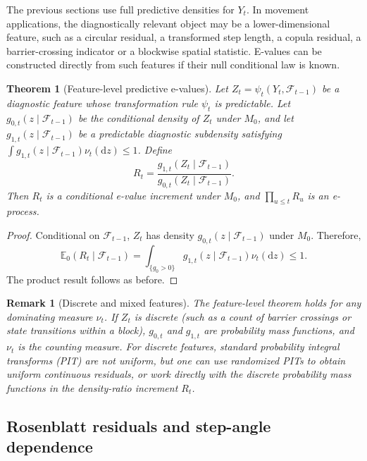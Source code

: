 \documentclass[pdflatex,sn-basic]{sn-jnl}
\theoremstyle{thmstyleone}
\newtheorem{theorem}{Theorem}
\theoremstyle{thmstyletwo}
\newtheorem{remark}{Remark}
\theoremstyle{thmstylethree}
\newcommand{\E}{\mathbb E}
\newcommand{\1}{\mathbf 1}
\newcommand{\calF}{\mathcal F}
\begin{document}
The previous sections use full predictive densities for $Y_t$. In movement applications, the diagnostically relevant object may be a lower-dimensional feature, such as a circular residual, a transformed step length, a copula residual, a barrier-crossing indicator or a blockwise spatial statistic. E-values can be constructed directly from such features if their null conditional law is known.

\begin{theorem}[Feature-level predictive e-values]
\label{thm:feature}
Let $Z_t=\psi_t(Y_t,\calF_{t-1})$ be a diagnostic feature whose transformation rule $\psi_t$ is predictable. Let $g_{0,t}(z\mid\calF_{t-1})$ be the conditional density of $Z_t$ under $M_0$, and let $g_{1,t}(z\mid\calF_{t-1})$ be a predictable diagnostic subdensity satisfying $\int g_{1,t}(z\mid\calF_{t-1})\nu_t(\mathrm dz)\leq1$. Define
\begin{equation}
 R_t=\frac{g_{1,t}(Z_t\mid\calF_{t-1})}{g_{0,t}(Z_t\mid\calF_{t-1})}.
\end{equation}
Then $R_t$ is a conditional e-value increment under $M_0$, and $\prod_{u\leq t}R_u$ is an e-process.
\end{theorem}

\begin{proof}
Conditional on $\calF_{t-1}$, $Z_t$ has density $g_{0,t}(z\mid\calF_{t-1})$ under $M_0$. Therefore,
\[
 \E_0(R_t\mid\calF_{t-1})=\int_{\{g_0>0\}}g_{1,t}(z\mid\calF_{t-1})\nu_t(\mathrm dz)\leq1.
\]
The product result follows as before.
\end{proof}

\begin{remark}[Discrete and mixed features]
The feature-level theorem holds for any dominating measure $\nu_t$. If $Z_t$ is discrete (such as a count of barrier crossings or state transitions within a block), $g_{0,t}$ and $g_{1,t}$ are probability mass functions, and $\nu_t$ is the counting measure. For discrete features, standard probability integral transforms (PIT) are not uniform, but one can use randomized PITs to obtain uniform continuous residuals, or work directly with the discrete probability mass functions in the density-ratio increment $R_t$.
\end{remark}

\subsection{Rosenblatt residuals and step-angle dependence}
\end{document}
